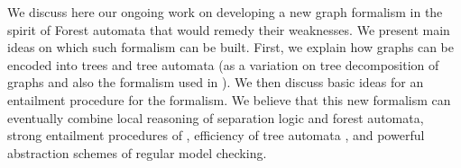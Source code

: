 {We discuss here our ongoing work on developing a new graph formalism in the spirit of Forest automata that would remedy their weaknesses.
%
We present main ideas on which such formalism can be built. 
First, we explain how graphs can be encoded into trees and tree automata (as a variation on tree decomposition of graphs \cite{Courcelle} and also the formalism used in \cite{iosif_treewidth_2013,iosif_deciding_2014}).
We then discuss basic ideas for an entailment procedure for the formalism.
%
We believe that this new formalism can eventually combine local reasoning of separation logic and forest automata, strong entailment procedures of \cite{Katelaan:seplog,pagel,Iosif:CSL,Iosif:LPAR}, efficiency of tree automata \cite{tacas10,almeida_reduction_2016,abdulla_computing_2008,libvata}, and powerful abstraction schemes of regular model checking.

%





}
